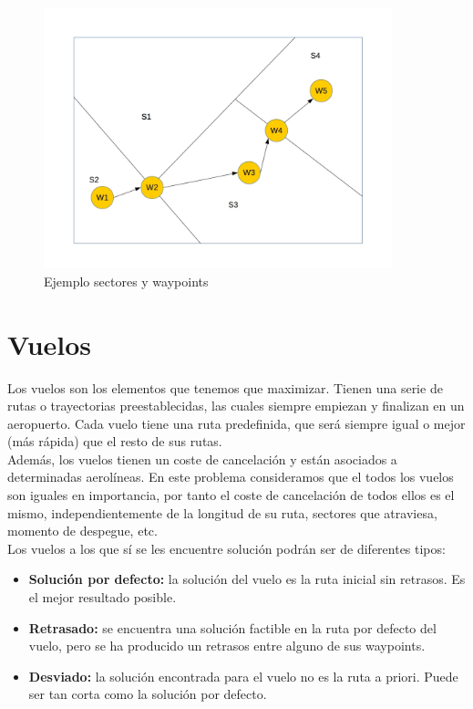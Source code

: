 \begin{figure}[H]
	\begin{center}
		\centering
		\includegraphics[width=0.9\textwidth]{./imagenes/descripcion_problema/sectoresYWaypoints.jpg}
		\caption{Ejemplo sectores y waypoints}
		\label{fig: Ejemplo sectores y waypoints}
	\end{center}
\end{figure}


\section{Vuelos}
Los vuelos son los elementos que tenemos que maximizar. Tienen una serie de rutas o trayectorias preestablecidas, las cuales siempre empiezan y finalizan en un aeropuerto. Cada vuelo tiene una ruta predefinida, que será siempre igual o mejor (más rápida) que el resto de sus rutas.\\
Además, los vuelos tienen un coste de cancelación y están asociados a determinadas aerolíneas. En este problema consideramos que el todos los vuelos son iguales en importancia, por tanto el coste de cancelación de todos ellos es el mismo, independientemente de la longitud de su ruta, sectores que atraviesa, momento de despegue, etc.\\

Los vuelos a los que sí se les encuentre solución podrán ser  de diferentes tipos:
\begin{itemize}
	\item \textbf{Solución por defecto:} la solución del vuelo es la ruta inicial sin retrasos. Es el mejor resultado posible.
	\item \textbf{Retrasado:} se encuentra una solución factible en la ruta por defecto del vuelo, pero se ha producido un retrasos entre alguno de sus waypoints.
	\item \textbf{Desviado:} la solución encontrada para el vuelo no es la ruta a priori. Puede ser tan corta como la solución por defecto.
\end{itemize}


